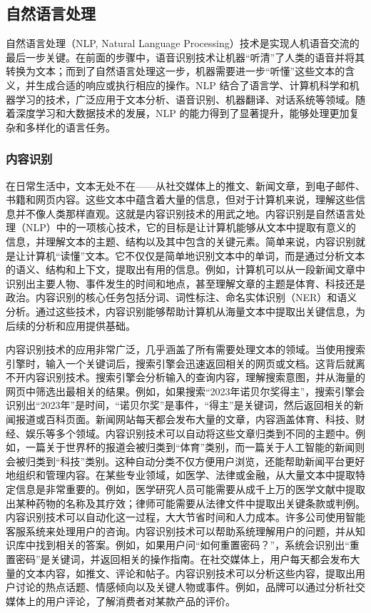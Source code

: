 \subsection{自然语言处理}

自然语言处理（NLP, Natural Language Processing）技术是实现人机语音交流的最后一步关键。在前面的步骤中，语音识别技术让机器“听清”了人类的语音并将其转换为文本；而到了自然语言处理这一步，机器需要进一步“听懂”这些文本的含义，并生成合适的响应或执行相应的操作。NLP 结合了语言学、计算机科学和机器学习的技术，广泛应用于文本分析、语音识别、机器翻译、对话系统等领域。随着深度学习和大数据技术的发展，NLP 的能力得到了显著提升，能够处理更加复杂和多样化的语言任务。

\subsubsection{内容识别}



在日常生活中，文本无处不在——从社交媒体上的推文、新闻文章，到电子邮件、书籍和网页内容。这些文本中蕴含着大量的信息，但对于计算机来说，理解这些信息并不像人类那样直观。这就是内容识别技术的用武之地。内容识别是自然语言处理（NLP）中的一项核心技术，它的目标是让计算机能够从文本中提取有意义的信息，并理解文本的主题、结构以及其中包含的关键元素。简单来说，内容识别就是让计算机“读懂”文本。它不仅仅是简单地识别文本中的单词，而是通过分析文本的语义、结构和上下文，提取出有用的信息。例如，计算机可以从一段新闻文章中识别出主要人物、事件发生的时间和地点，甚至理解文章的主题是体育、科技还是政治。内容识别的核心任务包括分词、词性标注、命名实体识别（NER）和语义分析。通过这些技术，内容识别能够帮助计算机从海量文本中提取出关键信息，为后续的分析和应用提供基础。

内容识别技术的应用非常广泛，几乎涵盖了所有需要处理文本的领域。当使用搜索引擎时，输入一个关键词后，搜索引擎会迅速返回相关的网页或文档。这背后就离不开内容识别技术。搜索引擎会分析输入的查询内容，理解搜索意图，并从海量的网页中筛选出最相关的结果。例如，如果搜索“2023年诺贝尔奖得主”，搜索引擎会识别出“2023年”是时间，“诺贝尔奖”是事件，“得主”是关键词，然后返回相关的新闻报道或百科页面。新闻网站每天都会发布大量的文章，内容涵盖体育、科技、财经、娱乐等多个领域。内容识别技术可以自动将这些文章归类到不同的主题中。例如，一篇关于世界杯的报道会被归类到“体育”类别，而一篇关于人工智能的新闻则会被归类到“科技”类别。这种自动分类不仅方便用户浏览，还能帮助新闻平台更好地组织和管理内容。在某些专业领域，如医学、法律或金融，从大量文本中提取特定信息是非常重要的。例如，医学研究人员可能需要从成千上万的医学文献中提取出某种药物的名称及其疗效；律师可能需要从法律文件中提取出关键条款或判例。内容识别技术可以自动化这一过程，大大节省时间和人力成本。许多公司使用智能客服系统来处理用户的咨询。内容识别技术可以帮助系统理解用户的问题，并从知识库中找到相关的答案。例如，如果用户问“如何重置密码？”，系统会识别出“重置密码”是关键词，并返回相关的操作指南。在社交媒体上，用户每天都会发布大量的文本内容，如推文、评论和帖子。内容识别技术可以分析这些内容，提取出用户讨论的热点话题、情感倾向以及关键人物或事件。例如，品牌可以通过分析社交媒体上的用户评论，了解消费者对某款产品的评价。

